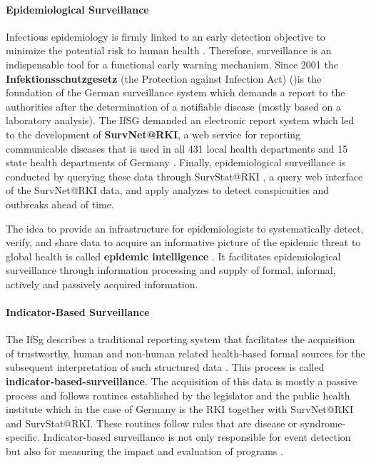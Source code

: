 \paragraph{Epidemiological Surveillance}
Infectious epidemiology is firmly linked to an early detection objective to minimize the potential risk to human health \citep{EarlyDetection}.
Therefore, surveillance is an indispensable tool for a functional early warning mechanism.
Since 2001 the \textbf{Infektionsschutzgesetz} (the Protection against Infection Act) ()is the foundation of the German surveillance system \citep{IfSG} which demands a report to the authorities after the determination of a notifiable disease (mostly based on a laboratory analysis).
The IfSG demanded an electronic report system which led to the development of \textbf{SurvNet@RKI}, a web service for reporting communicable diseases that is used in all 431 local health departments and 15 state health departments of Germany \citep{Faensen2006}.
Finally, epidemiological surveillance is conducted by querying these data through SurvStat@RKI \citep{Faensen2004}, a query web interface of the SurvNet@RKI data, and apply analyzes to detect conspicuities and outbreaks ahead of time.

The idea to provide an infrastructure for epidemiologists to systematically detect, verify, and share data to acquire an informative picture of the epidemic threat to global health is called \textbf{epidemic intelligence} \citep{EarlyDetection}. It facilitates epidemiological surveillance through information processing and supply of formal, informal, actively and passively acquired information.

\paragraph{Indicator-Based Surveillance}
The IfSg describes a traditional reporting system that facilitates the acquisition of trustworthy, human and non-human related health-based formal sources for the subsequent interpretation of such structured data \citep{EarlyDetection}. This process is called \textbf{indicator-based-surveillance}.
The acquisition of this data is mostly a passive process and follows routines established by the legislator and the public health institute which in the case of Germany is the RKI together with SurvNet@RKI and SurvStat@RKI.
These routines follow rules that are disease or syndrome-specific.
Indicator-based surveillance is not only responsible for event detection but also for measuring the impact and evaluation of programs \citep{EarlyDetection}.

